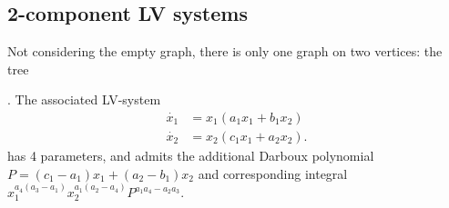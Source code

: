 \documentclass{article}
\begin{document}
\subsection{2-component LV systems}
Not considering the empty graph, there is only one graph on two vertices: the tree . The associated LV-system
\begin{equation} \label{xn2}
\begin{split}
\dot{x_{{1}}}&=x_{{1}} \left( a_{{1}}x_{{1}}+b_{{1}}x_{{2}} \right)\\
\dot{x_{{2}}}&=x_{{2}} \left( c_{{1}}x_{{1}}+a_{{2}}x_{{2}} \right).
\end{split}
\end{equation}
has 4 parameters, and admits the additional Darboux polynomial $P=(c_1 - a_1)x_1 + (a_2 - b_1)x_2$ and corresponding integral
$
x_{1}^{a_{4} \left(a_{3}-a_{1}\right)} x_{2}^{a_{1} \left(a_{2}-a_{4}\right)}P^{a_{1} a_{4}-a_{2} a_{3}} $.
\end{document}
